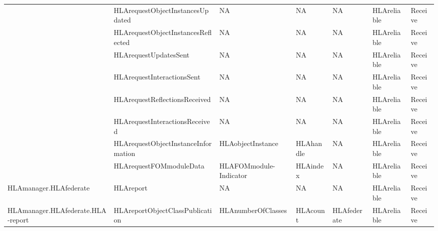 \begin{landscape}
\begin{momtabletypeset}[8.00]
{{\begin{tabular}{|Y{116.92pt}|Y{137.54pt}|Y{76.22pt}|Y{103.88pt}|Y{65.90pt}|Y{66.32pt}|Y{38.52pt}|}
                    & HLArequestObjectInstancesUpdated                    & NA                                & NA                        & NA          & HLAreliable & Receive \\
                    & HLArequestObjectInstancesReflected                  & NA                                & NA                        & NA          & HLAreliable & Receive \\
                    & HLArequestUpdatesSent                               & NA                                & NA                        & NA          & HLAreliable & Receive \\
                    & HLArequestInteractionsSent                          & NA                                & NA                        & NA          & HLAreliable & Receive \\
                    & HLArequestReflectionsReceived                       & NA                                & NA                        & NA          & HLAreliable & Receive \\
                    & HLArequestInteractionsReceived                      & NA                                & NA                        & NA          & HLAreliable & Receive \\
                    & HLArequestObjectInstanceInformation                 & HLAobjectInstance                 & HLAhandle                 & NA          & HLAreliable & Receive \\
                    & HLArequestFOMmoduleData                             & HLAFOMmodule-\newline Indicator   & HLAindex                  & NA          & HLAreliable & Receive \\
                    \hline
                    HLAmanager.\allowbreak{}HLAfederate                                   & HLAreport                                           & NA                                & NA                        & NA          & HLAreliable & Receive \\
                    \hline
                    HLAmanager.\allowbreak{}HLAfederate.\allowbreak{}HLA-\newline report  & HLAreportObjectClassPublication & HLAnumberOfClasses & HLAcount & HLAfederate & HLAreliable & Receive \\

\end{tabular}}}
\end{momtabletypeset}
\end{landscape}
